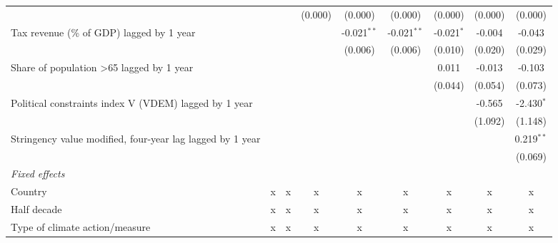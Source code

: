 \begin{tabular}{lcccccccc}
                                                             &               &               & (0.000)       & (0.000)        & (0.000)        & (0.000)       & (0.000)      & (0.000)\\   
   Tax revenue (\% of GDP) lagged by 1 year                  &               &               &               & -0.021$^{**}$  & -0.021$^{**}$  & -0.021$^{*}$  & -0.004       & -0.043\\   
                                                             &               &               &               & (0.006)        & (0.006)        & (0.010)       & (0.020)      & (0.029)\\   
   Share of population >65 lagged by 1 year                  &               &               &               &                &                & 0.011         & -0.013       & -0.103\\   
                                                             &               &               &               &                &                & (0.044)       & (0.054)      & (0.073)\\   
   Political constraints index V (VDEM) lagged by 1 year     &               &               &               &                &                &               & -0.565       & -2.430$^{*}$\\   
                                                             &               &               &               &                &                &               & (1.092)      & (1.148)\\   
   Stringency value modified, four-year lag lagged by 1 year &               &               &               &                &                &               &              & 0.219$^{**}$\\   
                                                             &               &               &               &                &                &               &              & (0.069)\\   
   \emph{Fixed effects}\\
   Country                                                   & x             & x             & x             & x              & x              & x             & x            & x\\  
   Half decade                                               & x             & x             & x             & x              & x              & x             & x            & x\\  
   Type of climate action/measure                            & x             & x             & x             & x              & x              & x             & x            & x\\  

\end{tabular}

